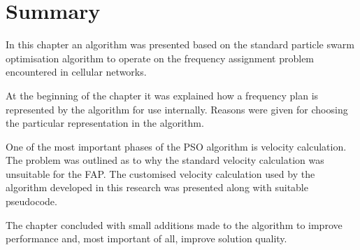 \section{Summary}
In this chapter an algorithm was presented based on the standard particle swarm optimisation algorithm to operate on the frequency assignment problem encountered in cellular networks.

At the beginning of the chapter it was explained how a frequency plan is represented by the algorithm for use internally. Reasons were given for choosing the particular representation in the algorithm.

One of the most important phases of the PSO algorithm is velocity calculation. The problem was outlined as to why the standard velocity calculation was unsuitable for the FAP. The customised velocity calculation used by the algorithm developed in this research was presented along with suitable pseudocode.

The chapter concluded with small additions made to the algorithm to improve performance and, most important of all, improve solution quality.
